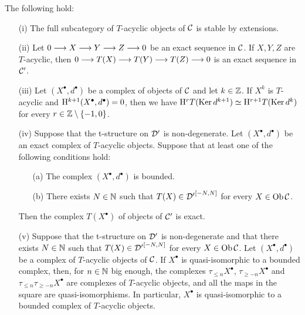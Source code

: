 \begin{lemma}
The following hold:
\begin{itemize}
\item[(i)] The full subcategory of $T$-acyclic objects of $\mathcal{C}$ is stable by extensions.

\item[(ii)] Let $0\longrightarrow X\longrightarrow Y\longrightarrow Z\longrightarrow 0$ be an exact sequence in $\mathcal{C}$. If $X,Y,Z$ are $T$-acyclic, then $0\longrightarrow T(X)\longrightarrow T(Y)\longrightarrow T(Z)\longrightarrow 0$
is an exact sequence in $\mathcal{C}'$.

\item[(iii)] Let $(X^\bullet,d^\bullet)$ be a complex of objects of $\mathcal{C}$ and let $k\in\mathbb{Z}$. If $X^k$ is $T$-acyclic and $\mathrm{H}^{k+1}(X^\bullet,d^\bullet)=0$, then we have
$\mathrm{H}^r T(\operatorname{Ker} d^{k+1})\simeq\mathrm{H}^{r+1}T(\operatorname{Ker} d^k)$ for every $r\in\mathbb{Z}\setminus\{-1,0\}$.

\item[(iv)] Suppose that the t-structure on $\mathcal{D}'$ is non-degenerate.
Let $(X^\bullet,d^\bullet)$ be an exact complex of $T$-acyclic objects. Suppose that at least one of the following conditions hold:
\begin{itemize}
\item[(a)] The complex $(X^\bullet,d^\bullet)$ is bounded.
\item[(b)] There exists $N\in\mathbb{N}$ such that $T(X)\in{\mathcal{D}'}^{[-N,N]}$ for every $X\in\operatorname{\mathrm{Ob}}\mathcal{C}$.

\end{itemize}
Then the complex $T(X^\bullet)$ of objects of $\mathcal{C}'$ is exact.

\item[(v)] Suppose that the t-structure on $\mathcal{D}'$ is non-degenerate and
that there exists $N\in\mathbb{N}$ such that $T(X)\in{\mathcal{D}'}^{[-N,N]}$ for every $X\in\operatorname{\mathrm{Ob}}\mathcal{C}$.
Let $(X^\bullet,d^\bullet)$ be a complex of $T$-acyclic objects of $\mathcal{C}$. If $X^\bullet$ is quasi-isomorphic to a bounded complex, then, for $n\in\mathbb{N}$ big enough,
the complexes $\tau_{\leq n}X^\bullet$, $\tau_{\geq -n}X^\bullet$ and $\tau_{\leq n}\tau_{\geq -n}X^\bullet$ are complexes of $T$-acyclic objects, and all the maps in the square
are quasi-isomorphisms. In particular, $X^\bullet$ is quasi-isomorphic to a bounded
complex of $T$-acyclic objects.

\end{itemize}
\label{lemma_der_fil}
\end{lemma}

